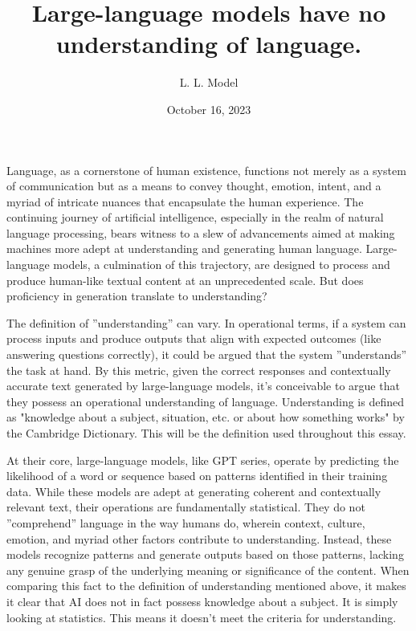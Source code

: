 \documentclass{article}
\title{Large-language models have no understanding of language.}
\date{October 16, 2023}
\author{L. L. Model}
\begin{document}
  \maketitle

Language, as a cornerstone of human existence, functions not merely as a
system of communication but as a means to convey thought, emotion, intent,
and a myriad of intricate nuances that encapsulate the human experience. 
The continuing journey of artificial intelligence, especially in the realm of
natural language processing, bears witness to a slew of advancements aimed at
making machines more adept at understanding and generating human language.
Large-language models, a culmination of this trajectory, are designed to process
and produce human-like textual content at an unprecedented scale. But does
proficiency in generation translate to understanding?

The definition of ”understanding” can vary. In operational terms, if a system can process inputs and produce outputs that align with expected outcomes
(like answering questions correctly), it could be argued that the system ”understands” the task at hand. By this metric, given the correct responses and contextually accurate text
generated by large-language models, it’s conceivable to argue that they possess an operational understanding of language. Understanding is defined as "knowledge about a subject, situation, etc. or about how something works" by the Cambridge Dictionary.
\cite{cambridgeUnderstanding}
This will be the definition used throughout this essay.
\cite{dreyfus1992what}

At their core, large-language models, like GPT series, operate by predicting
the likelihood of a word or sequence based on patterns identified in their training data. While these models are adept at generating coherent and contextually
relevant text, their operations are fundamentally statistical. They do not ”comprehend” language in the way humans do, wherein context, culture, emotion,
and myriad other factors contribute to understanding. Instead, these models
recognize patterns and generate outputs based on those patterns, lacking any
genuine grasp of the underlying meaning or significance of the content. When comparing this fact to the definition of understanding mentioned above, it makes it clear that AI does not in fact possess knowledge about a subject. It is simply looking at statistics. This means it doesn't meet the criteria for understanding.
\cite{vapnik1998statistical}
\end{document}
